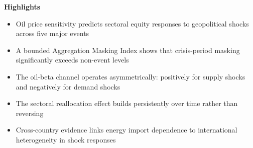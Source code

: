 \documentclass[12pt]{article}
\begin{document}
\noindent\textbf{Highlights}

\bigskip

\begin{itemize}
\item Oil price sensitivity predicts sectoral equity responses to geopolitical shocks across five major events
\item A bounded Aggregation Masking Index shows that crisis-period masking significantly exceeds non-event levels
\item The oil-beta channel operates asymmetrically: positively for supply shocks and negatively for demand shocks
\item The sectoral reallocation effect builds persistently over time rather than reversing
\item Cross-country evidence links energy import dependence to international heterogeneity in shock responses
\end{itemize}
\end{document}
